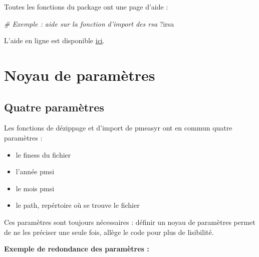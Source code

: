 \documentclass[]{book}
\newenvironment{Shaded}{\begin{snugshade}}{\end{snugshade}}
\newcommand{\CommentTok}[1]{\textcolor[rgb]{0.56,0.35,0.01}{\textit{#1}}}
\newcommand{\NormalTok}[1]{#1}
\providecommand{\tightlist}{%
  \setlength{\itemsep}{0pt}\setlength{\parskip}{0pt}}
\begin{document}
Toutes les fonctions du package ont une page d'aide :

\begin{Shaded}
\begin{Highlighting}[]
\CommentTok{# Exemple : aide sur la fonction d'import des rsa}
\NormalTok{?irsa}
\end{Highlighting}
\end{Shaded}

L'aide en ligne est disponible \href{https://im-aphp.github.io/pmeasyr}{ici}.

\hypertarget{noyau-de-parametres}{%
\chapter{Noyau de paramètres}\label{noyau-de-parametres}}

\hypertarget{quatre-parametres}{%
\section{Quatre paramètres}\label{quatre-parametres}}

Les fonctions de dézippage et d'import de pmeasyr ont en commun quatre paramètres :

\begin{itemize}
\tightlist
\item
  le finess du fichier
\item
  l'année pmsi
\item
  le mois pmsi
\item
  le path, repértoire où se trouve le fichier
\end{itemize}

Ces paramètres sont toujours nécessaires : définir un noyau de paramètres permet de ne les préciser une seule fois, allège le code pour plus de lisibilité.

\textbf{Exemple de redondance des paramètres :}
\end{document}
